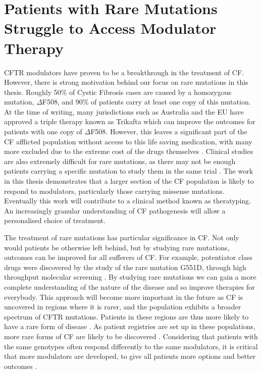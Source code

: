 \section{Patients with Rare Mutations Struggle to Access Modulator Therapy}
CFTR modulators have proven to be a breakthrough in the treatment of CF. However, there is strong motivation behind our focus on rare mutations in this thesis. Roughly 50\% of Cystic Fibrosis cases are caused by a homozygous mutation, $\Delta$F508, and 90\% of patients carry at least one copy of this mutation. At the time of writing, many jurisdictions such as Australia and the EU have approved a triple therapy known as Trikafta which can improve the outcomes for patients with one copy of $\Delta$F508. However, this leaves a significant part of the CF afflicted population without access to this life saving medication, with many more excluded due to the extreme cost of the drugs themselves \cite{administration2021, trikafta_website, abdallah2021, guo2022a}. Clinical studies are also extremely difficult for rare mutations, as there may not be enough patients carrying a specific mutation to study them in the same trial \cite{grody2007}. The work in this thesis demonstrates that a larger section of the CF population is likely to respond to modulators, particularly those carrying missense mutations. Eventually this work will contribute to a clinical method known as theratyping. An increasingly granular understanding of CF pathogenesis will allow a personalised choice of treatment.

The treatment of rare mutations has particular significance in CF. Not only would patients be otherwise left behind, but by studying rare mutations, outcomes can be improved for all sufferers of CF. For example, potentiator class drugs were discovered by the study of the rare mutation G551D, through high throughput molecular screening \cite{vangoor2009}. By studying rare mutations we can gain a more complete understanding of the nature of the disease and so improve therapies for everybody. This approach will become more important in the future as CF is uncovered in regions where it is rarer, and the population exhibits a broader spectrum of CFTR mutations. Patients in these regions are thus more likely to have a rare form of disease \cite{singh2015,zheng2017,ni2022}. As patient registries are set up in these populations, more rare forms of CF are likely to be discovered \cite{zheng2017}. Considering that patients with the same genotypes often respond differently to the same modulators, it is critical that more modulators are developed, to give all patients more options and better outcomes \cite{hanafin2021}.

